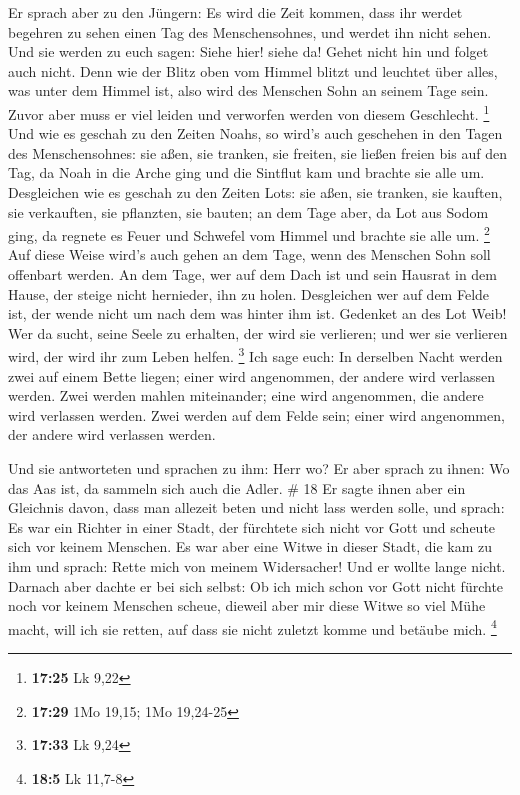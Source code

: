  Er sprach aber zu den Jüngern: Es wird die Zeit kommen,
dass ihr werdet begehren zu sehen einen Tag des Menschensohnes, und
werdet ihn nicht sehen.  Und sie werden zu euch sagen:
Siehe hier! siehe da! Gehet nicht hin und folget auch nicht.
 Denn wie der Blitz oben vom Himmel blitzt und leuchtet
über alles, was unter dem Himmel ist, also wird des Menschen Sohn an
seinem Tage sein.  Zuvor aber muss er viel leiden und
verworfen werden von diesem Geschlecht. \footnote{\textbf{17:25} Lk 9,22}
 Und wie es geschah zu den Zeiten Noahs, so wird's auch
geschehen in den Tagen des Menschensohnes:  sie aßen, sie
tranken, sie freiten, sie ließen freien bis auf den Tag, da Noah in die
Arche ging und die Sintflut kam und brachte sie alle um. 
Desgleichen wie es geschah zu den Zeiten Lots: sie aßen, sie tranken,
sie kauften, sie verkauften, sie pflanzten, sie bauten;  an
dem Tage aber, da Lot aus Sodom ging, da regnete es Feuer und Schwefel
vom Himmel und brachte sie alle um. \footnote{\textbf{17:29} 1Mo 19,15;
  1Mo 19,24-25}  Auf diese Weise wird's auch gehen an dem
Tage, wenn des Menschen Sohn soll offenbart werden.  An dem
Tage, wer auf dem Dach ist und sein Hausrat in dem Hause, der steige
nicht hernieder, ihn zu holen. Desgleichen wer auf dem Felde ist, der
wende nicht um nach dem was hinter ihm ist.  Gedenket an
des Lot Weib!  Wer da sucht, seine Seele zu erhalten, der
wird sie verlieren; und wer sie verlieren wird, der wird ihr zum Leben
helfen. \footnote{\textbf{17:33} Lk 9,24}  Ich sage euch:
In derselben Nacht werden zwei auf einem Bette liegen; einer wird
angenommen, der andere wird verlassen werden.  Zwei werden
mahlen miteinander; eine wird angenommen, die andere wird verlassen
werden.  Zwei werden auf dem Felde sein; einer wird
angenommen, der andere wird verlassen werden.

 Und sie antworteten und sprachen zu ihm: Herr wo? Er aber
sprach zu ihnen: Wo das Aas ist, da sammeln sich auch die Adler. \# 18
 Er sagte ihnen aber ein Gleichnis davon, dass man allezeit
beten und nicht lass werden solle,  und sprach: Es war ein
Richter in einer Stadt, der fürchtete sich nicht vor Gott und scheute
sich vor keinem Menschen.  Es war aber eine Witwe in dieser
Stadt, die kam zu ihm und sprach: Rette mich von meinem Widersacher!
 Und er wollte lange nicht. Darnach aber dachte er bei sich
selbst: Ob ich mich schon vor Gott nicht fürchte noch vor keinem
Menschen scheue,  dieweil aber mir diese Witwe so viel Mühe
macht, will ich sie retten, auf dass sie nicht zuletzt komme und betäube
mich. \footnote{\textbf{18:5} Lk 11,7-8}

